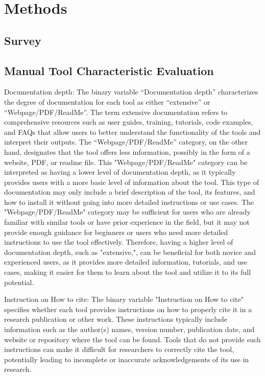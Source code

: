 \section{Methods}

\subsection{Survey}

\subsection{Manual Tool Characteristic Evaluation}

Documentation depth: The binary variable “Documentation depth” characterizes the degree of documentation for each tool as either “extensive” or “Webpage/PDF/ReadMe”. The term extensive documentation refers to comprehensive resources such as user guides, training, tutorials, code examples, and FAQs that allow users to better understand the functionality of the tools and interpret their outputs. The “Webpage/PDF/ReadMe” category, on the other hand, designates that the tool offers less information, possibly in the form of a website, PDF, or readme file. This "Webpage/PDF/ReadMe" category can be interpreted as having a lower level of documentation depth, as it typically provides users with a more basic level of information about the tool. This type of documentation may only include a brief description of the tool, its features, and how to install it without going into more detailed instructions or use cases. The "Webpage/PDF/ReadMe" category may be sufficient for users who are already familiar with similar tools or have prior experience in the field, but it may not provide enough guidance for beginners or users who need more detailed instructions to use the tool effectively. Therefore, having a higher level of documentation depth, such as "extensive,", can be beneficial for both novice and experienced users, as it provides more detailed information, tutorials, and use cases, making it easier for them to learn about the tool and utilize it to its full potential.

Instruction on How to cite: The binary variable "Instruction on How to cite" specifies whether each tool provides instructions on how to properly cite it in a research publication or other work. These instructions typically include information such as the author(s) names, version number, publication date, and website or repository where the tool can be found. Tools that do not provide such instructions can make it difficult for researchers to correctly cite the tool, potentially leading to incomplete or inaccurate acknowledgements of its use in research.

